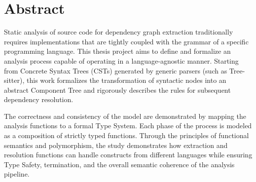 \frontmatter
\chapter{Abstract}
Static analysis of source code for dependency graph extraction
traditionally requires implementations that are tightly coupled with
the grammar of a specific programming language. This thesis project
aims to define and formalize an analysis process capable of operating
in a language-agnostic manner. Starting from Concrete Syntax Trees
(CSTs) generated by generic parsers (such as Tree-sitter), this work
formalizes the transformation of syntactic nodes into an abstract
Component Tree and rigorously describes the rules for subsequent
dependency resolution.

The correctness and consistency of the model are demonstrated by
mapping the analysis functions to a formal Type System. Each phase of
the process is modeled as a composition of strictly typed functions.
Through the principles of functional semantics and polymorphism, the
study demonstrates how extraction and resolution functions can handle
constructs from different languages while ensuring Type Safety,
termination, and the overall semantic coherence of the analysis pipeline.


\mainmatter

